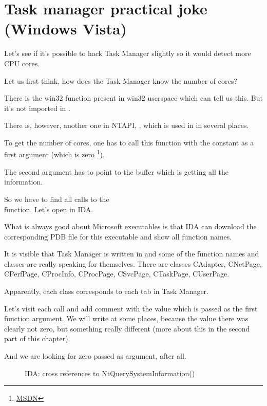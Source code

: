 ﻿\section{Task manager practical joke (Windows Vista)}

Let's see if it's possible to hack Task Manager slightly so it would detect more \ac{CPU} cores.


Let us first think, how does the Task Manager know the number of cores?

There is the  win32 function present in win32 userspace which can tell us this.
But it's not imported in .

There is, however, another one in \gls{NTAPI}, , 
which is used in  in several places.

To get the number of cores, one has to call this function with the  constant
as a first argument (which is zero
\footnote{\href{http://go.yurichev.com/17251}{MSDN}}).

The second argument has to point to the buffer which is getting all the information.

So we have to find all calls to the \\
 function.
Let's open  in IDA. 

What is always good about Microsoft executables is that IDA can download the corresponding \gls{PDB} 
file for this executable and show all function names.

It is visible that Task Manager is written in \Cpp and some of the function names and classes are really 
speaking for themselves.
There are classes CAdapter, CNetPage, CPerfPage, CProcInfo, CProcPage, CSvcPage, 
CTaskPage, CUserPage.

Apparently, each class corresponds to each tab in Task Manager.

Let's visit each call and add comment with the value which is passed as the first function argument.
We will write  at some places, because the value there was clearly not zero, 
but something really different (more about this in the second part of this chapter).

And we are looking for zero passed as argument, after all.

\begin{figure}[H]
\centering
{}
\caption{IDA: cross references to NtQuerySystemInformation()}
\end{figure}

